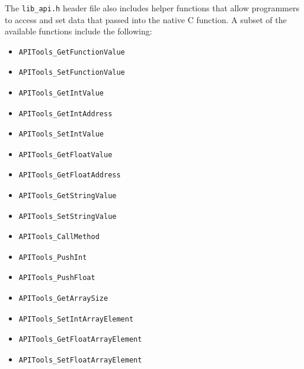 \documentclass[11pt]{article}
\begin{document}
The \texttt{lib\_api.h} header file also includes helper functions
that allow programmers to access and set data that passed into the
native C function.  A subset of the available functions include the
following:

\begin{itemize}
\item \begin{verbatim}APITools_GetFunctionValue\end{verbatim}
\item \begin{verbatim}APITools_SetFunctionValue\end{verbatim}
\item \begin{verbatim}APITools_GetIntValue\end{verbatim}
\item \begin{verbatim}APITools_GetIntAddress\end{verbatim}
\item \begin{verbatim}APITools_SetIntValue\end{verbatim}
\item \begin{verbatim}APITools_GetFloatValue\end{verbatim}
\item \begin{verbatim}APITools_GetFloatAddress\end{verbatim}
\item \begin{verbatim}APITools_GetStringValue\end{verbatim}
\item \begin{verbatim}APITools_SetStringValue\end{verbatim}
\item \begin{verbatim}APITools_CallMethod\end{verbatim}
\item \begin{verbatim}APITools_PushInt\end{verbatim}
\item \begin{verbatim}APITools_PushFloat\end{verbatim}
\item \begin{verbatim}APITools_GetArraySize\end{verbatim}
\item \begin{verbatim}APITools_SetIntArrayElement\end{verbatim}
\item \begin{verbatim}APITools_GetFloatArrayElement\end{verbatim}
\item \begin{verbatim}APITools_SetFloatArrayElement\end{verbatim}
\end{itemize}
\end{document}
